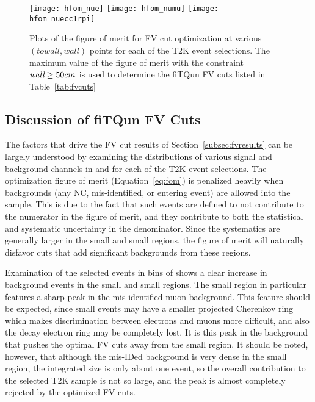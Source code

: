 \begin{figure}[h]
  \begin{center}
    \texttt{[image: hfom\_nue]}
    \texttt{[image: hfom\_numu]}
    \texttt{[image: hfom\_nuecc1rpi]}
  \end{center}
  \caption{Plots of the figure of merit for FV cut optimization at various
  $(towall,wall)$ points for each of the T2K event selections. The maximum value of the figure of merit with the
  constraint $\emph{wall} \geq 50 cm$ is used to determine the fiTQun FV cuts listed in
  Table~\ref{tab:fvcuts}}
  \label{fig:fom}
\end{figure}



\subsection{Discussion of fiTQun FV Cuts}
\label{subsec:fvdiscuss}

The factors that drive the FV cut results of Section~\ref{subsec:fvresults} can
be largely understood by examining the distributions of various signal
and background channels in \wall and \towall for each of the T2K event
selections.  The optimization figure of merit (Equation~\ref{eq:fom}) is
penalized heavily when backgrounds (any NC, mis-identified, or entering event)
are allowed into the sample.  This is due to the fact that such events are
defined to not contribute to the numerator in the figure of merit, and they
contribute to both the statistical and systematic uncertainty in the
denominator. Since the systematics are generally larger in the
small \wall and small \towall regions, the figure of merit will naturally
disfavor cuts that add significant backgrounds from these regions.  


Examination of the selected \nue events in bins of \towall shows a clear
increase in background events in the small \towall and small \wall regions.
The small \towall region in particular features a sharp peak in the
mis-identified muon background.  This feature should be expected, since small
\towall events may have a smaller projected Cherenkov ring which makes
discrimination between electrons and muons more difficult, and also the decay
electron ring may be completely lost. It is this peak in the background that pushes
the optimal FV cuts away from the small \towall region.  It should be noted,
however, that although the mis-IDed background is very dense in the small
\towall region, the integrated size is only about one event, so the overall
contribution to the selected \nue T2K sample is not so large, and the peak
is almost completely rejected by the optimized FV cuts.

